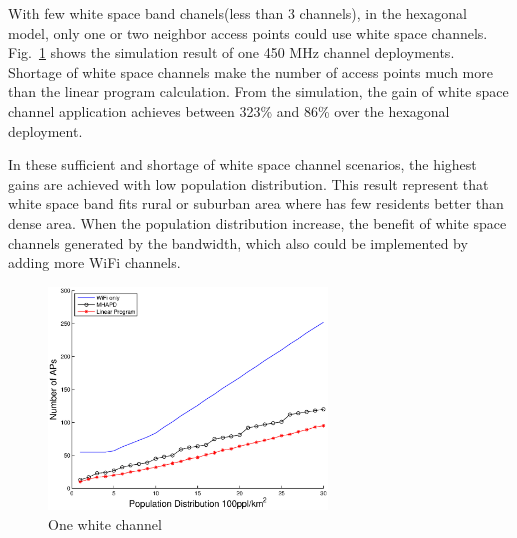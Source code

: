 With few white space band chanels(less than 3 channels), in the hexagonal model, only one or 
two neighbor access points could use white space channels. Fig.~\ref{fig:onewhitechannel}
shows the simulation result of one 450 MHz channel deployments. Shortage of white space channels
make the number of access points much more than the linear program calculation. From the 
simulation, the gain of white space channel application achieves between 323\% and 86\%
over the hexagonal deployment. 

In these sufficient and shortage of white space channel scenarios, the highest gains are achieved with 
low population distribution. This result represent that white space band fits rural or suburban
area where has few residents better than dense area. When the population distribution increase, the 
benefit of white space channels generated by the bandwidth, which also could be implemented by adding 
more WiFi channels.

\begin{figure}
\centering
\includegraphics[width=74mm]{figures/onewhitechannel}
\vspace{-0.1in}
\caption{One white channel}                                                                 
\label{fig:onewhitechannel}
\vspace{-0.1in}
\end{figure}

